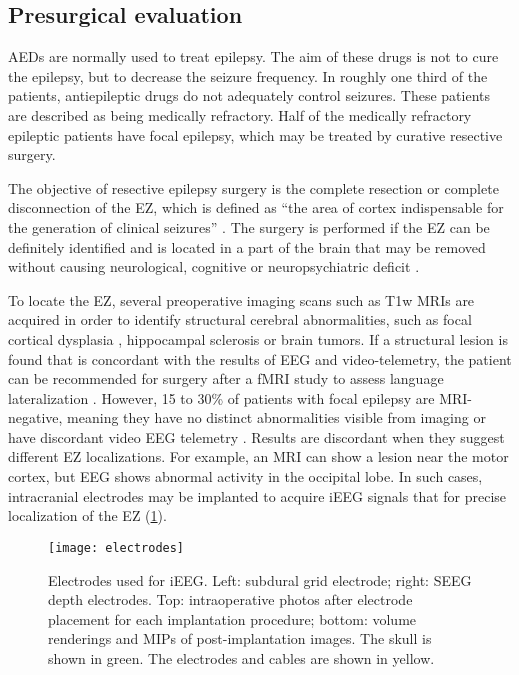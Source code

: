 \subsection{Presurgical evaluation}

\Acp{AED} are normally used to treat epilepsy.
The aim of these drugs is not to cure the epilepsy, but to decrease the seizure frequency.
In roughly one third of the patients, antiepileptic drugs do not adequately control seizures.
These patients are described as being medically refractory.
Half of the medically refractory epileptic patients have focal epilepsy, which may be treated by curative resective surgery.

The objective of resective epilepsy surgery is the complete resection or complete disconnection of the \ac{EZ}, which is defined as ``the area of cortex indispensable for the generation of clinical seizures'' \cite{rosenow_presurgical_2001}.
The surgery is performed if the \ac{EZ} can be definitely identified and is located in a part of the brain that may be removed without causing neurological, cognitive or neuropsychiatric deficit \cite{jobst_resective_2015}.

To locate the \ac{EZ}, several preoperative imaging scans such as \ac{T1w} \acp{MRI} are acquired in order to identify structural cerebral abnormalities, such as focal cortical dysplasia \cite{kabat_focal_2012}, hippocampal sclerosis \cite{thom_review_2014} or brain tumors.
If a structural lesion is found that is concordant with the results of \ac{EEG} and video-telemetry, the patient can be recommended for surgery after a \ac{fMRI} study to assess language lateralization \cite{duncan_brain_2016}.
However, 15 to 30\% of patients with focal epilepsy are \ac{MRI}-negative, meaning they have no distinct abnormalities visible from imaging or have discordant video \ac{EEG} telemetry \cite{bien_characteristics_2009}.
Results are discordant when they suggest different \ac{EZ} localizations.
For example, an \ac{MRI} can show a lesion near the motor cortex, but \ac{EEG} shows abnormal activity in the occipital lobe.
In such cases, intracranial electrodes may be implanted to acquire \ac{iEEG} signals that for precise localization of the \ac{EZ} (\cref{fig:electrodes}).

\begin{figure}
  \centering
  \texttt{[image: electrodes]}
  \caption[Electrodes used for intracranial EEG]{
    Electrodes used for \ac{iEEG}.
    Left: subdural grid electrode;
    right: \ac{SEEG} depth electrodes.
    Top: intraoperative photos after electrode placement for each implantation procedure;
    bottom: volume renderings and \acp{MIP} of post-implantation images.
    The skull is shown in green.
    The electrodes and cables are shown in yellow.
  }\label{fig:electrodes}
\end{figure}

